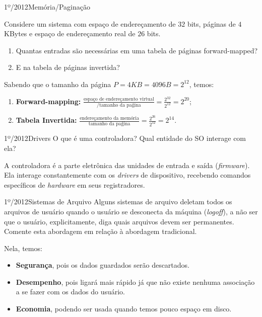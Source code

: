 \begin{exercicio}
  {1º/2012}{Memória/Paginação}
  {Considere um sistema com espaço de endereçamento de $32$ bits, páginas de $4$ KBytes e espaço de endereçamento real de $26$ bits.
  \begin{enumerate}[label=(\alph*)]
    \item Quantas entradas são necessárias em uma tabela de páginas forward-mapped?
    \item E na tabela de páginas invertida?
  \end{enumerate}}

  Sabendo que o tamanho da página $P = 4KB = 4096B = 2^{12}$, temos:
  \begin{enumerate}[label=(\alph*)]
    \item \textbf{Forward-mapping:}
    $\frac{\text{espaço de endereçamento virtual}}{\text{/tamanho da paǵina}} =
    \frac{2^{32}}{2^{12}} = 2^{20}$;

    \item \textbf{Tabela Invertida:} $\frac{\text{endereçamento da memória}}{\text{tamanho da paǵina}} = \frac{2^{26}}{2^{12}} = 2^{14}$.
  \end{enumerate}
\end{exercicio}

\begin{exercicio}
  {1º/2012}{Drivers}
  {O que é uma controladora? Qual entidade do SO interage com ela?}

  A controladora é a parte eletrônica das unidades de entrada e saída (\textit{firmware}). Ela interage constantemente com os \textit{drivers} de dispositivo, recebendo comandos específicos de \textit{hardware} em seus registradores.
\end{exercicio}

\begin{exercicio}
  {1º/2012}{Sistemas de Arquivo}
  {Alguns sistemas de arquivo deletam todos os arquivos de usuário quando o usuário se desconecta da máquina (\textit{logoff}), a não ser que o usuário, explicitamente, diga quais arquivos devem ser permanentes. Comente esta abordagem em relação à abordagem tradicional.}

  Nela, temos:
  \begin{itemize}
    \item \textbf{Segurança}, pois os dados guardados serão descartados.
    \item \textbf{Desempenho}, pois ligará mais rápido já que não existe nenhuma associação a se fazer com os dados do usuário.
    \item \textbf{Economia}, podendo ser usada quando temos pouco espaço em disco.
  \end{itemize}
\end{exercicio}

